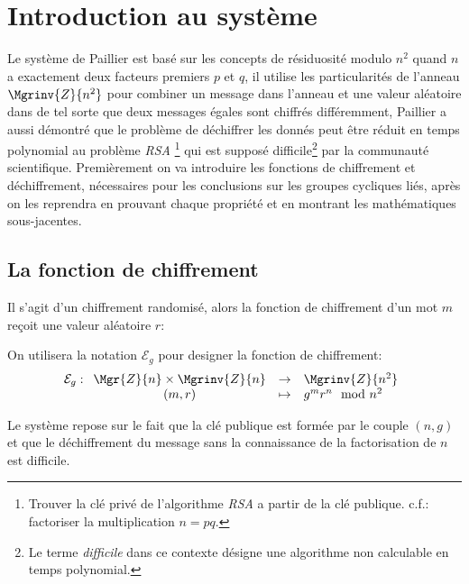 \chapter{Introduction au système}
	Le système de Paillier est basé sur les concepts de résiduosité modulo $n^2$ quand $n$ a exactement 
	deux facteurs premiers $p$ et $q$,
	il utilise les particularités de l'anneau $\Mgrinv{Z}{n^2}$ pour combiner un message 
	dans l'anneau  et une valeur aléatoire dans  de tel sorte que deux messages égales 
	sont chiffrés différemment, Paillier a aussi démontré que le problème de dé\-chif\-frer les donnés peut être 
	réduit en temps polynomial au problème \emph{RSA} \footnote{Trouver la clé privé de l'algorithme \emph{RSA} a partir 
	de la clé publique. c.f.: factoriser la multiplication $n = pq$.} qui est supposé difficile\footnote{Le terme {\it difficile} dans ce contexte désigne 
	une algorithme non calculable en temps polynomial.} par la communauté scientifique. 
	Premièrement on va introduire les fonctions de chiffrement et déchiffrement, nécessaires pour les conclusions sur les 
	groupes cycliques liés, après on les reprendra en prouvant chaque propriété et en montrant les mathématiques sous-jacentes. 



	\section{La fonction de chiffrement}
		Il s'agit d'un chiffrement randomisé, alors la fonction de chiffrement d'un mot $m$ reçoit une valeur aléatoire $r$:%
		\begin{definition} On utilisera la notation $\mathcal{E}_g$ pour designer la fonction de chiffrement:
			\begin{equation}
					\mathcal{E}_g : \begin{array}[t]{ccl} \Mgr{Z}{n} \times \Mgrinv{Z}{n} &\rightarrow & \Mgrinv{Z}{n^2}  \\
						(m,r)&\mapsto& g^mr^n\mod{n^2}	 \end{array}
			\end{equation}
		\end{definition}

		Le système repose sur le fait que la clé publique est formée par le couple $(n,g)$ et que le déchiffrement du message
		sans la connaissance de la factorisation de $n$ est difficile.
